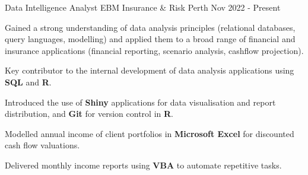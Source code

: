 

\begin{cventries}

  \cventry
    {Data Intelligence Analyst} %
    {EBM Insurance \& Risk} %
    {Perth} %
    {Nov 2022 - Present} %
    {
      \begin{cvitems} %
        \item {Gained a strong understanding of data analysis principles (relational databases, query languages, modelling) and applied them to a broad range of financial and insurance applications (financial reporting, scenario analysis, cashflow projection).}
        \item {Key contributor to the internal development of data analysis applications using \textbf{SQL} and \textbf{R}.}
        \item {Introduced the use of \textbf{Shiny} applications for data visualisation and report distribution, and \textbf{Git} for version control in \textbf{R}.}
        \item {Modelled annual income of client portfolios in \textbf{Microsoft Excel} for discounted cash flow valuations.}
        \item {Delivered monthly income reports using \textbf{VBA} to automate repetitive tasks.}
      \end{cvitems}
    }

\end{cventries}
